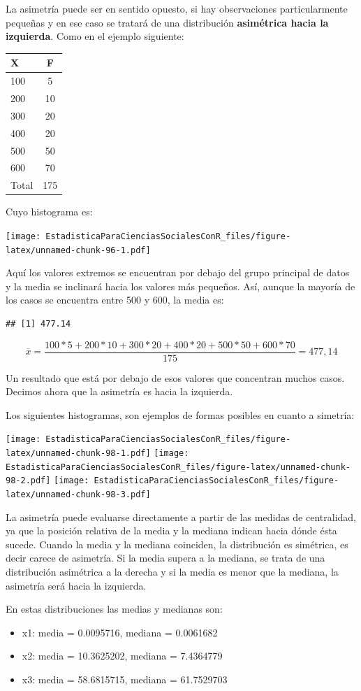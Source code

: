 \documentclass[]{book}
\providecommand{\tightlist}{%
  \setlength{\itemsep}{0pt}\setlength{\parskip}{0pt}}
\begin{document}
La asimetría puede ser en sentido opuesto, si hay observaciones
particularmente pequeñas y en ese caso se tratará de una distribución
\textbf{asimétrica hacia la izquierda}. Como en el ejemplo siguiente:

\begin{longtable}[]{@{}lc@{}}
\toprule
X & F\tabularnewline
\midrule
\endhead
100 & 5\tabularnewline
200 & 10\tabularnewline
300 & 20\tabularnewline
400 & 20\tabularnewline
500 & 50\tabularnewline
600 & 70\tabularnewline
Total & 175\tabularnewline
\bottomrule
\end{longtable}

Cuyo histograma es:

\texttt{[image: EstadisticaParaCienciasSocialesConR\_files/figure-latex/unnamed-chunk-96-1.pdf]}

Aquí los valores extremos se encuentran por debajo del grupo principal
de datos y la media se inclinará hacia los valores más pequeños. Así,
aunque la mayoría de los casos se encuentra entre 500 y 600, la media
es:

\begin{verbatim}
## [1] 477.14
\end{verbatim}

\[\overline{x} = \frac{100*5 + 200*10 + 300*20 + 400*20 + 500*50 + 600*70}{175} = 477,14\]

Un resultado que está por debajo de esos valores que concentran muchos
casos. Decimos ahora que la asimetría es hacia la izquierda.

Los siguientes histogramas, son ejemplos de formas posibles en cuanto a simetría:

\texttt{[image: EstadisticaParaCienciasSocialesConR\_files/figure-latex/unnamed-chunk-98-1.pdf]} \texttt{[image: EstadisticaParaCienciasSocialesConR\_files/figure-latex/unnamed-chunk-98-2.pdf]} \texttt{[image: EstadisticaParaCienciasSocialesConR\_files/figure-latex/unnamed-chunk-98-3.pdf]}

La asimetría puede evaluarse directamente a partir de las medidas de
centralidad, ya que la posición relativa de la media y la mediana
indican hacia dónde ésta sucede. Cuando la media y la mediana coinciden,
la distribución es simétrica, es decir carece de asimetría. Si la media
supera a la mediana, se trata de una distribución asimétrica a la
derecha y si la media es menor que la mediana, la asimetría será hacia
la izquierda.

En estas distribuciones las medias y medianas son:

\begin{itemize}
\tightlist
\item
  x1: media = 0.0095716, mediana = 0.0061682
\item
  x2: media = 10.3625202, mediana = 7.4364779
\item
  x3: media = 58.6815715, mediana = 61.7529703
\end{itemize}
\end{document}
